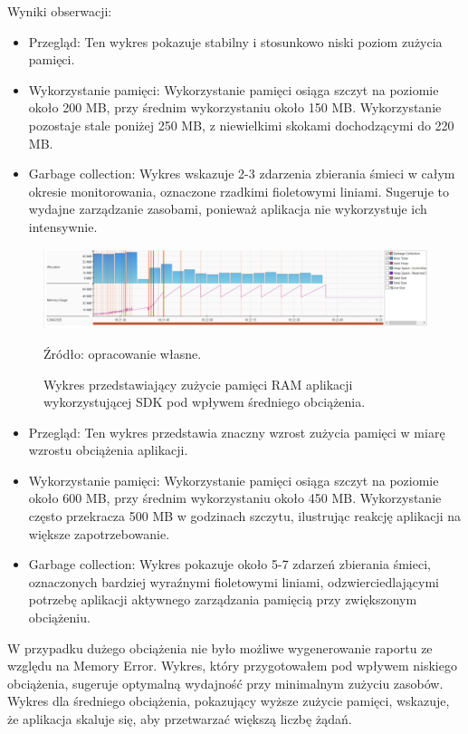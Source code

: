 \documentclass[runningheads,12pt]{llncs}
\begin{document}
Wyniki obserwacji:

\begin{itemize}
    \item Przegląd: Ten wykres pokazuje stabilny i stosunkowo niski poziom zużycia pamięci.
    \item Wykorzystanie pamięci: Wykorzystanie pamięci osiąga szczyt na poziomie około 200 MB, przy średnim wykorzystaniu około 150 MB. Wykorzystanie pozostaje stale poniżej 250 MB, z niewielkimi skokami dochodzącymi do 220 MB.
    \item Garbage collection: Wykres wskazuje 2-3 zdarzenia zbierania śmieci w całym okresie monitorowania, oznaczone rzadkimi fioletowymi liniami. Sugeruje to wydajne zarządzanie zasobami, ponieważ aplikacja nie wykorzystuje ich intensywnie.
\end{itemize}

\newpage

\begin{figure}
    \includegraphics[width=\linewidth]{images/sdk-memory-middle-graph.jpg}
    \caption{Wykres przedstawiający zużycie pamięci  RAM aplikacji wykorzystującej SDK pod wpływem średniego obciążenia.} \label{fig1}
    \vspace{0.5em}
    {\small Źródło: opracowanie własne.}
\end{figure}

\begin{itemize}
    \item Przegląd: Ten wykres przedstawia znaczny wzrost zużycia pamięci w miarę wzrostu obciążenia aplikacji.
    \item Wykorzystanie pamięci: Wykorzystanie pamięci osiąga szczyt na poziomie około 600 MB, przy średnim wykorzystaniu około 450 MB. Wykorzystanie często przekracza 500 MB w godzinach szczytu, ilustrując reakcję aplikacji na większe zapotrzebowanie.
    \item Garbage collection: Wykres pokazuje około 5-7 zdarzeń zbierania śmieci, oznaczonych bardziej wyraźnymi fioletowymi liniami, odzwierciedlającymi potrzebę aplikacji aktywnego zarządzania pamięcią przy zwiększonym obciążeniu.
\end{itemize}

W przypadku dużego obciążenia nie było możliwe wygenerowanie raportu ze względu na Memory Error.
Wykres, który przygotowałem pod wpływem niskiego obciążenia, sugeruje optymalną wydajność przy minimalnym zużyciu zasobów. Wykres dla średniego obciążenia, pokazujący wyższe zużycie pamięci, wskazuje, że aplikacja skaluje się, aby przetwarzać większą liczbę żądań.
\newpage
\end{document}
